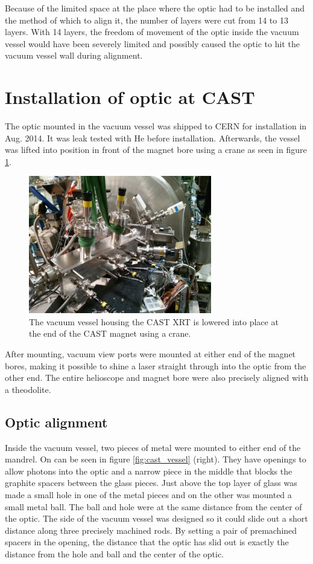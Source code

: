 Because of the limited space at the place where the optic had to be installed and the method of which to align it, the number of layers were cut from 14 to 13 layers. With 14 layers, the freedom of movement of the optic inside the vacuum vessel would have been severely limited and possibly caused the optic to hit the vacuum vessel wall during alignment.

\section{Installation of optic at CAST}
The optic mounted in the vacuum vessel was shipped to CERN for installation in Aug. 2014. It was leak tested with He before installation. Afterwards, the vessel was lifted into position in front of the magnet bore using a crane as seen in figure \ref{fig:cast_install}.

\begin{figure}[htbp]
  \centering
    \includegraphics[height=6cm]{figures/cast/castxrt_install.jpg}
  \caption{\footnotesize The vacuum vessel housing the CAST XRT is lowered into place at the end of the CAST magnet using a crane.}
  \label{fig:cast_install}
\end{figure}

After mounting, vacuum view ports were mounted at either end of the magnet bores, making it possible to shine a laser straight through into the optic from the other end. The entire helioscope and magnet bore were also precisely aligned with a theodolite.

\subsection{Optic alignment}\label{sec:optic_alignment}
Inside the vacuum vessel, two pieces of metal were mounted to either end of the mandrel. On can be seen in figure \ref{fig:cast_vessel} (right). They have openings to allow photons into the optic and a narrow piece in the middle that blocks the graphite spacers between the glass pieces. Just above the top layer of glass was made a small hole in one of the metal pieces and on the other was mounted a small metal ball. The ball and hole were at the same distance from the center of the optic. The side of the vacuum vessel was designed so it could slide out a short distance along three precisely machined rods. By setting a pair of premachined spacers in the opening, the distance that the optic has slid out is exactly the distance from the hole and ball and the center of the optic.

